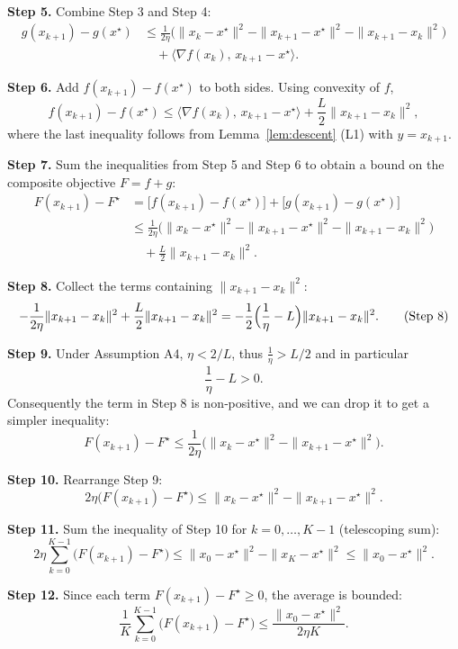 \documentclass{article}
\begin{document}
\noindent\textbf{Step 5.} Combine Step 3 and Step 4:
\[
\begin{aligned}
g(x_{k+1})-g(x^{\star})
&\le
\frac{1}{2\eta}\bigl(\|x_{k}-x^{\star}\|^{2}
-\|x_{k+1}-x^{\star}\|^{2}
-\|x_{k+1}-x_{k}\|^{2}\bigr)\\
&\quad +\langle\nabla f(x_{k}),\,x_{k+1}-x^{\star}\rangle .
\end{aligned}
\tag{Step 5}
\]

\noindent\textbf{Step 6.} Add $f(x_{k+1})-f(x^{\star})$ to both sides.
Using convexity of $f$,
\[
f(x_{k+1})-f(x^{\star})\le \langle\nabla f(x_{k}),\,x_{k+1}-x^{\star}\rangle
      +\frac{L}{2}\|x_{k+1}-x_{k}\|^{2},
\tag{Step 6}
\]
where the last inequality follows from Lemma~\ref{lem:descent} (L1) with $y=x_{k+1}$.

\noindent\textbf{Step 7.} Sum the inequalities from Step 5 and Step 6 to obtain a bound on the composite objective $F=f+g$:
\[
\begin{aligned}
F(x_{k+1})-F^{\star}
&= \bigl[f(x_{k+1})-f(x^{\star})\bigr]+\bigl[g(x_{k+1})-g(x^{\star})\bigr]\\
&\le
\frac{1}{2\eta}\bigl(\|x_{k}-x^{\star}\|^{2}
-\|x_{k+1}-x^{\star}\|^{2}
-\|x_{k+1}-x_{k}\|^{2}\bigr)\\
&\quad +\frac{L}{2}\|x_{k+1}-x_{k}\|^{2}.
\end{aligned}
\tag{Step 7}
\]

\noindent\textbf{Step 8.} Collect the terms containing $\|x_{k+1}-x_{k}\|^{2}$:
\[
-\frac{1}{2\eta}\|x_{k+1}-x_{k}\|^{2}
+\frac{L}{2}\|x_{k+1}-x_{k}\|^{2}
= -\frac{1}{2}\Bigl(\frac{1}{\eta}-L\Bigr)\|x_{k+1}-x_{k}\|^{2}.
\tag{Step 8}
\]

\noindent\textbf{Step 9.} Under Assumption A4, $\eta<2/L$, thus $\frac{1}{\eta}>L/2$ and in particular
\[
\frac{1}{\eta}-L>0.
\]
Consequently the term in Step 8 is non‑positive, and we can drop it to get a simpler inequality:
\[
F(x_{k+1})-F^{\star}
\le
\frac{1}{2\eta}\bigl(\|x_{k}-x^{\star}\|^{2}
-\|x_{k+1}-x^{\star}\|^{2}\bigr).
\tag{Step 9}
\]

\noindent\textbf{Step 10.} Rearrange Step 9:
\[
2\eta\bigl(F(x_{k+1})-F^{\star}\bigr)
\le
\|x_{k}-x^{\star}\|^{2}
-\|x_{k+1}-x^{\star}\|^{2}.
\tag{Step 10}
\]

\noindent\textbf{Step 11.} Sum the inequality of Step 10 for $k=0,\dots, K-1$ (telescoping sum):
\[
2\eta\sum_{k=0}^{K-1}\bigl(F(x_{k+1})-F^{\star}\bigr)
\le
\|x_{0}-x^{\star}\|^{2}
-\|x_{K}-x^{\star}\|^{2}
\le
\|x_{0}-x^{\star}\|^{2}.
\tag{Step 11}
\]

\noindent\textbf{Step 12.} Since each term $F(x_{k+1})-F^{\star}\ge0$, the average is bounded:
\[
\frac{1}{K}\sum_{k=0}^{K-1}\bigl(F(x_{k+1})-F^{\star}\bigr)
\le
\frac{\|x_{0}-x^{\star}\|^{2}}{2\eta K}.
\tag{Step 12}
\]
\end{document}
